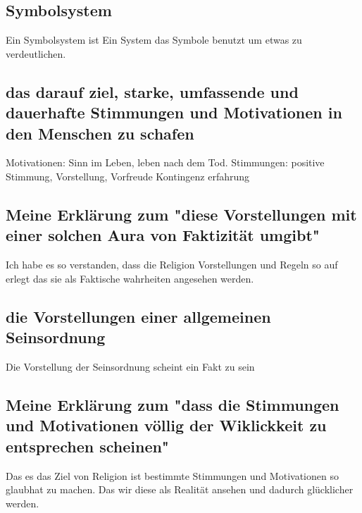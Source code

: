 \documentclass{article}
\begin{document}
\subsection{Symbolsystem}
Ein Symbolsystem ist Ein System das Symbole benutzt um etwas zu verdeutlichen.

\subsection{das darauf ziel, starke, umfassende und dauerhafte Stimmungen und Motivationen in den Menschen zu schafen}
\begin{flushleft}
Motivationen: Sinn im Leben, leben nach dem Tod. \linebreak 
Stimmungen: positive Stimmung, Vorstellung, Vorfreude \linebreak
Kontingenz erfahrung
\end{flushleft}

\subsection{Meine Erklärung zum "diese Vorstellungen mit einer solchen Aura von Faktizität umgibt"}
Ich habe es so verstanden, dass die Religion Vorstellungen und Regeln so auf erlegt das sie als Faktische wahrheiten angesehen werden.

\subsection{die Vorstellungen einer allgemeinen Seinsordnung}
Die Vorstellung der Seinsordnung scheint ein Fakt zu sein

\subsection{Meine Erklärung zum "dass die Stimmungen und Motivationen völlig der Wiklickkeit zu entsprechen scheinen"}
Das es das Ziel von Religion ist bestimmte Stimmungen und Motivationen so glaubhat zu machen.
Das wir diese als Realität ansehen und dadurch glücklicher werden.
\end{document}

